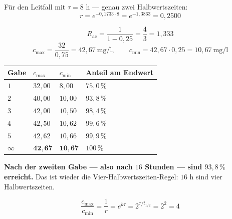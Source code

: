 \begin{merksatz}
Für den Leitfall mit $\tau = 8$ h --- genau zwei Halbwertszeiten:
\[ r = e^{-0{,}1733 \cdot 8} = e^{-1{,}3863} = 0{,}2500 \]

\begin{center}
\begin{minipage}{0.88\textwidth}
\end{minipage}
\end{center}

\[ R_{\text{ac}} = \frac{1}{1-0{,}25} = \frac{4}{3} = 1{,}333 \]
\[ c_{\max} = \frac{32}{0{,}75} = 42{,}67\ \mathrm{mg/l}, \qquad c_{\min} = 42{,}67 \cdot 0{,}25 = 10{,}67\ \mathrm{mg/l} \]

\begin{center}
{\small
\renewcommand{\arraystretch}{1.42}
\begin{tabular}{@{}P{1.4cm}P{1.8cm}P{1.8cm}P{2.4cm}@{}}
\toprule
\textbf{Gabe} & $c_{\max}$ & $c_{\min}$ & \textbf{Anteil am Endwert}\\
\midrule
$1$ & $32{,}00$ & $8{,}00$ & $75{,}0\,\%$\\
$2$ & $40{,}00$ & $10{,}00$ & $93{,}8\,\%$\\
$3$ & $42{,}00$ & $10{,}50$ & $98{,}4\,\%$\\
$4$ & $42{,}50$ & $10{,}62$ & $99{,}6\,\%$\\
$5$ & $42{,}62$ & $10{,}66$ & $99{,}9\,\%$\\
$\infty$ & $\mathbf{42{,}67}$ & $\mathbf{10{,}67}$ & $100\,\%$\\
\bottomrule
\end{tabular}}
\end{center}

\begin{center}
\begin{minipage}{0.9\textwidth}
\textbf{Nach der zweiten Gabe --- also nach $16$ Stunden --- sind $93{,}8\,\%$ erreicht.} Das ist wieder die Vier-Halbwertszeiten-Regel: $16$ h sind vier Halbwertszeiten.
\end{minipage}
\end{center}

\[ \frac{c_{\max}}{c_{\min}} = \frac{1}{r} = e^{k\tau} = 2^{\tau/t_{1/2}} = 2^{2} = 4 \]


\end{merksatz}
